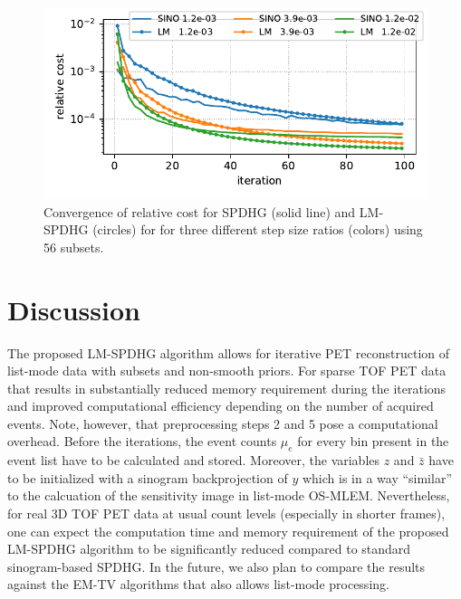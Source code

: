 \documentclass{IEEEtran}
\begin{document}
\begin{figure}[t]
\centerline{\includegraphics[width=0.8\columnwidth]{./figs/brain2d_counts_1.0E+06_beta_2.0E-03_niter_10000_100_nsub_56_precond_False_metrics.pdf}}
\caption{Convergence of relative cost for SPDHG (solid line) and LM-SPDHG (circles) 
for for three different step size ratios (colors) using 56 subsets.}
\label{fig:cost}
\end{figure}


\section{Discussion}

The proposed LM-SPDHG algorithm allows for  iterative PET reconstruction of list-mode
data with subsets and non-smooth priors.
For sparse TOF PET data that results in substantially reduced memory requirement during
the iterations and improved computational efficiency depending on the number of acquired
events.
Note, however, that preprocessing steps 2 and 5 pose a computational overhead. 
Before the iterations, the event counts $\mu_e$ for every bin present in the event list
have to be calculated and stored.
Moreover, the variables $z$ and $\bar{z}$ have to be initialized with a sinogram
backprojection of $y$ which is in a way ``similar'' to the calcuation of the sensitivity
image in list-mode OS-MLEM.
Nevertheless, for real 3D TOF PET data at usual count levels (especially in shorter frames), one can
expect the computation time and memory requirement of the proposed LM-SPDHG algorithm to be significantly reduced compared to standard sinogram-based SPDHG.
In the future, we also plan to compare the results against the EM-TV algorithms that also
allows list-mode processing.

\end{document}
